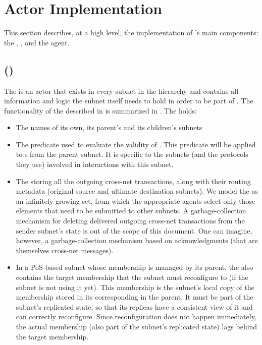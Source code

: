  \section{\ipc Actor Implementation}
 \label{sec:components}


This section describes, at a high level, the implementation of \ipc's main components: the \gw, \sa, and the \ipc agent.

\subsection{\gwFull (\gw)}
\label{sec:gw}

The \gw is an actor that exists in every subnet in the \ipc hierarchy and contains all information and logic the subnet itself needs to hold in order to be part of \ipc.
The functionality of the \gw described in  is summarized in .
The \gw holds:
\begin{itemize}
    \item The names of its own, its parent's and its children's subnets

    \item The predicate used to evaluate the validity of \pofsFull.
    This predicate will be applied to {\pof}s from the parent subnet.
    It is specific to the subnets (and the protocols they use) involved in interactions with this subnet.

    \item The \postoffice storing all the outgoing cross-net transactions, along with their routing metadata (original source and ultimate destination subnets).
    We model the \postoffice as an infinitely growing set, from which the appropriate \ipc agents select only those elements that need to be submitted to other subnets.
    A garbage-collection mechanism for deleting delivered outgoing cross-net transactions from the sender subnet's state is out of the scope of this document.
    One can imagine, however, a garbage-collection mechanism based on acknowledgments (that are themselves cross-net messages).

    \item In a PoS-based subnet whose membership is managed by its parent, the \gw also contains the target membership that the subnet must reconfigure to (if the subnet is not using it yet).
    This membership is the subnet's local copy of the membership stored in its corresponding \saFull in the parent.
    It must be part of the subnet's replicated state, so that its replicas have a consistent view of it and can correctly reconfigure.
    Since reconfiguration does not happen immediately, the actual membership (also part of the subnet's replicated state) lags behind the target membership.

\end{itemize}

